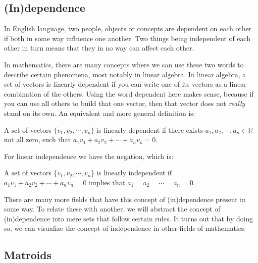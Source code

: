 \subsection{(In)dependence}

In English language, two people, objects or concepts are dependent on each other if both in some way influence one another. Two things being independent of each other in turn means that they in no way can affect each other. 

    In mathematics, there are many concepts where we can use these two words to describe certain phenomena, most notably in linear algebra. In linear algebra, a set of vectors is linearly dependent if you can write one of its vectors as a linear combination of the others. Using the word dependent here makes sense, because if you can use all others to build that one vector, then that vector does not \textit{really} stand on its own. An equivalent and more general definition is:


    \begin{defn}

    A set of vectors $\{v_1,v_2,\cdots,v_n\}$ is linearly dependent if there exists $a_1,a_2,\cdots,a_n \in \mathbb{R} $ not all zero, such that $a_1v_1+a_2v_2+\cdots +a_nv_n = 0.$
    
    \end{defn}




For linear independence we have the negation, which is:
\begin{defn}
    A set of vectors $ \{v_1,v_2,\cdots,v_n\}$ is linearly independent if $a_1v_1+a_2v_2+\cdots+a_nv_n=0$ implies that $a_1=a_2=\cdots=a_n=0.$

\end{defn}
There are many more fields that have this concept of (in)dependence present in some way. To relate these with another, we will abstract the concept of (in)dependence into mere sets that follow certain rules. It turns out that by doing so, we can visualize the concept of independence in other fields of mathematics.





\subsection{Matroids}

